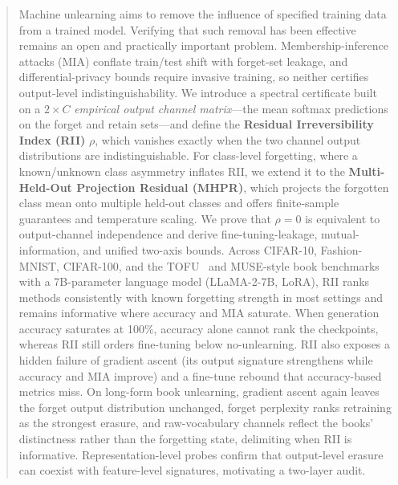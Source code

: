 \documentclass[smallextended]{svjour3}       %
\begin{document}
\begin{abstract}
Machine unlearning aims to remove the influence of specified training data from a trained model. Verifying that such removal has been effective remains an open and practically important problem. Membership-inference attacks (MIA) conflate train/test shift with forget-set leakage, and differential-privacy bounds require invasive training, so neither certifies output-level indistinguishability. We introduce a spectral certificate built on a $2\times C$ \emph{empirical output channel matrix}---the mean softmax predictions on the forget and retain sets---and define the \textbf{Residual Irreversibility Index (RII)} $\rho$, which vanishes exactly when the two channel output distributions are indistinguishable. For class-level forgetting, where a known/unknown class asymmetry inflates RII, we extend it to the \textbf{Multi-Held-Out Projection Residual (MHPR)}, which projects the forgotten class mean onto multiple held-out classes and offers finite-sample guarantees and temperature scaling. We prove that $\rho=0$ is equivalent to output-channel independence and derive fine-tuning-leakage, mutual-information, and unified two-axis bounds. Across CIFAR-10, Fashion-MNIST, CIFAR-100, and the TOFU~\cite{maini2024tofu} and MUSE-style book benchmarks with a 7B-parameter language model (LLaMA-2-7B, LoRA), RII ranks methods consistently with known forgetting strength in most settings and remains informative where accuracy and MIA saturate. When generation accuracy saturates at 100\%, accuracy alone cannot rank the checkpoints, whereas RII still orders fine-tuning below no-unlearning. RII also exposes a hidden failure of gradient ascent (its output signature strengthens while accuracy and MIA improve) and a fine-tune rebound that accuracy-based metrics miss. On long-form book unlearning, gradient ascent again leaves the forget output distribution unchanged, forget perplexity ranks retraining as the strongest erasure, and raw-vocabulary channels reflect the books' distinctness rather than the forgetting state, delimiting when RII is informative. Representation-level probes confirm that output-level erasure can coexist with feature-level signatures, motivating a two-layer audit.
\end{abstract}

\end{document}
